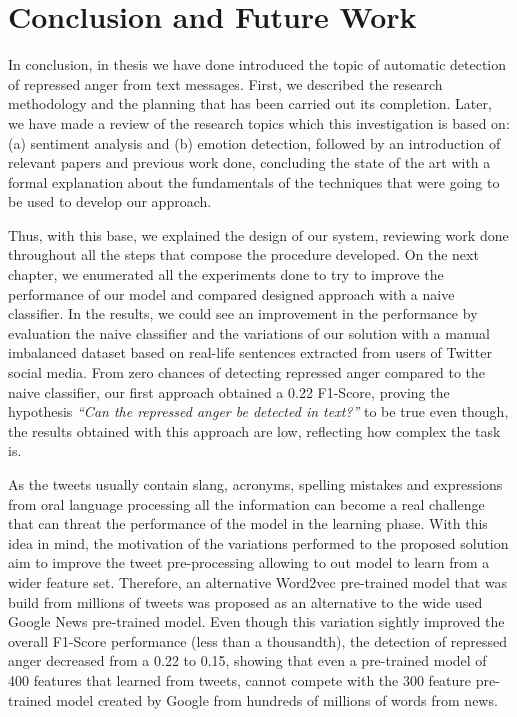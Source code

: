 \chapter{Conclusion and Future Work}

In conclusion, in thesis we have done introduced the topic of automatic detection of repressed anger from text messages. First, we described the research methodology and the planning that has been carried out its completion. Later, we have made a review of the research topics which this investigation is based on: (a) sentiment analysis and (b) emotion detection, followed by an introduction of relevant papers and previous work done, concluding the state of the art with a formal explanation about the fundamentals of the techniques that were going to be used to develop our approach.

Thus, with this base, we explained the design of our system, reviewing work done throughout all the steps that compose the procedure developed. On the next chapter, we enumerated all the experiments done to try to improve the performance of our model and compared designed approach with a naive classifier. In the results, we could see an improvement in the performance by evaluation the naive classifier and the variations of our solution with a manual imbalanced dataset based on real-life sentences extracted from users of Twitter social media. From zero chances of detecting repressed anger compared to the naive classifier, our first approach obtained a 0.22 F1-Score, proving the hypothesis \textit{``Can the repressed anger be detected in text?''} to be true even though, the results obtained with this approach are low, reflecting how complex the task is.

As the tweets usually contain slang, acronyms, spelling mistakes and expressions from oral language processing all the information can become a real challenge that can threat the performance of the model in the learning phase. With this idea in mind, the motivation of the variations performed to the proposed solution aim to improve the tweet pre-processing allowing to out model to learn from a wider feature set. Therefore, an alternative Word2vec pre-trained model that was build from millions of tweets was proposed as an alternative to the wide used Google News pre-trained model. Even though this variation sightly improved the overall F1-Score performance (less than a thousandth), the detection of repressed anger decreased from a 0.22 to 0.15, showing that even a pre-trained model of 400 features that learned from tweets, cannot compete with the 300 feature pre-trained model created by Google from hundreds of millions of words from news.

